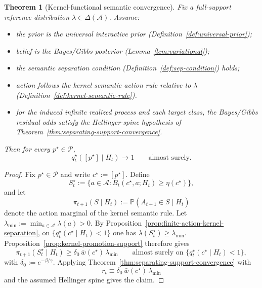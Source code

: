 \documentclass[11pt]{article}
\newtheorem{theorem}{Theorem}[section]
\theoremstyle{definition}
\theoremstyle{remark}
\newcommand{\Acal}{\mathcal{A}}
\newcommand{\Pcal}{\mathcal{P}}
\newcommand{\Prob}{\mathbb{P}}
\begin{document}
\begin{theorem}[Kernel-functional semantic convergence]
\label{thm:kernel-semantic-convergence}
Fix a full-support reference distribution $\lambda\in\Delta(\Acal)$. Assume:
\begin{itemize}
\item[(C1)] the prior is the universal interactive prior (Definition~\ref{def:universal-prior});
\item[(C2)] belief is the Bayes/Gibbs posterior (Lemma~\ref{lem:variational});
\item[(C3)] the semantic separation condition (Definition~\ref{def:sep-condition}) holds;
\item[(K4)] action follows the kernel semantic action rule relative to $\lambda$ (Definition~\ref{def:kernel-semantic-rule}).
\item[(K5)] for the induced infinite realized process and each target class, the Bayes/Gibbs residual odds satisfy the Hellinger-spine hypothesis of Theorem~\ref{thm:separating-support-convergence}.
\end{itemize}
Then for every $p^\star\in\Pcal$,
\[
q_t^\star([p^\star]\mid H_t)\longrightarrow 1
\qquad
\text{almost surely.}
\]
\end{theorem}

\begin{proof}
Fix $p^\star\in\Pcal$ and write $c^\star:=[p^\star]$. Define
\[
S_t^\star:=\{a\in\Acal:B_t(c^\star,a;H_t)\ge \eta(c^\star)\},
\]
and let
\[
\pi_{t+1}(S\mid H_t):=\Prob(A_{t+1}\in S\mid H_t)
\]
denote the action marginal of the kernel semantic rule. Let $\lambda_{\min}:=\min_{a\in\Acal}\lambda(a)>0$. By Proposition~\ref{prop:finite-action-kernel-separation}, on $\{q_t^\star(c^\star\mid H_t)<1\}$ one has $\lambda(S_t^\star)\ge \lambda_{\min}$. Proposition~\ref{prop:kernel-promotion-support} therefore gives
\[
\pi_{t+1}(S_t^\star\mid H_t)\ge \delta_0\,\bar w(c^\star)\,\lambda_{\min}
\qquad\text{almost surely on }\{q_t^\star(c^\star\mid H_t)<1\},
\]
with $\delta_0:=e^{-\beta/\gamma}$. Applying Theorem~\ref{thm:separating-support-convergence} with
\[
r_t\equiv \delta_0\,\bar w(c^\star)\,\lambda_{\min}
\]
and the assumed Hellinger spine gives the claim.
\end{proof}
\end{document}
